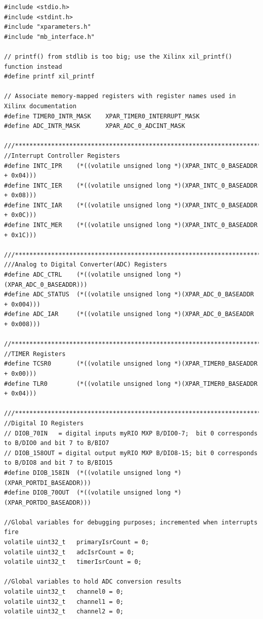 \documentclass[twoside]{article}
\begin{document}
\begin{lstlisting}[frame=single]
#include <stdio.h>
#include <stdint.h>
#include "xparameters.h"
#include "mb_interface.h"

// printf() from stdlib is too big; use the Xilinx xil_printf() function instead
#define printf xil_printf

// Associate memory-mapped registers with register names used in Xilinx documentation
#define TIMER0_INTR_MASK	XPAR_TIMER0_INTERRUPT_MASK
#define ADC_INTR_MASK 		XPAR_ADC_0_ADCINT_MASK

///************************************************************************************************
//Interrupt Controller Registers
#define INTC_IPR 	(*((volatile unsigned long *)(XPAR_INTC_0_BASEADDR + 0x04)))
#define INTC_IER 	(*((volatile unsigned long *)(XPAR_INTC_0_BASEADDR + 0x08)))
#define INTC_IAR 	(*((volatile unsigned long *)(XPAR_INTC_0_BASEADDR + 0x0C)))
#define INTC_MER 	(*((volatile unsigned long *)(XPAR_INTC_0_BASEADDR + 0x1C)))

///*************************************************************************************************
///Analog to Digital Converter(ADC) Registers
#define ADC_CTRL 	(*((volatile unsigned long *)(XPAR_ADC_0_BASEADDR)))
#define ADC_STATUS 	(*((volatile unsigned long *)(XPAR_ADC_0_BASEADDR + 0x004)))
#define ADC_IAR 	(*((volatile unsigned long *)(XPAR_ADC_0_BASEADDR + 0x008)))

//***************************************************************************************************
//TIMER Registers
#define TCSR0  		(*((volatile unsigned long *)(XPAR_TIMER0_BASEADDR + 0x00)))
#define TLR0  		(*((volatile unsigned long *)(XPAR_TIMER0_BASEADDR + 0x04)))

///***************************************************************************************************
//Digital IO Registers
// DIOB_70IN   = digital inputs myRIO MXP B/DIO0-7;  bit 0 corresponds to B/DIO0 and bit 7 to B/BIO7
// DIOB_158OUT = digital output myRIO MXP B/DIO8-15; bit 0 corresponds to B/DIO8 and bit 7 to B/BIO15
#define DIOB_158IN	(*((volatile unsigned long *)(XPAR_PORTDI_BASEADDR)))
#define DIOB_70OUT	(*((volatile unsigned long *)(XPAR_PORTDO_BASEADDR)))

//Global variables for debugging purposes; incremented when interrupts fire
volatile uint32_t	primaryIsrCount = 0;
volatile uint32_t	adcIsrCount = 0;
volatile uint32_t	timerIsrCount = 0;

//Global variables to hold ADC conversion results
volatile uint32_t	channel0 = 0;
volatile uint32_t 	channel1 = 0;
volatile uint32_t	channel2 = 0;


\end{lstlisting}
\end{document}
